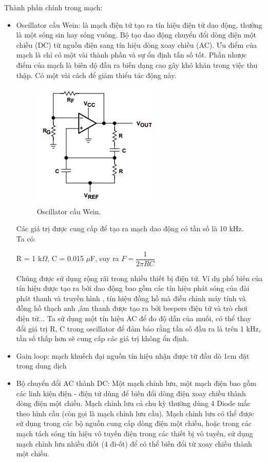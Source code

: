 \documentclass[a4paper,12pt,oneside]{article}
\begin{document}
\begin{enumerate}
\noindent Thành phần chính trong mạch:
\begin{itemize}
\item Oscillator cầu Wein: là mạch điện tử tạo ra tín hiệu điện tử dao động, thường là một sóng sin hay sóng vuông. Bộ tạo dao động chuyển đổi dòng điện một chiều (DC) từ nguồn điện sang tín hiệu dòng xoay chiều (AC). Ưu điểm của mạch là chỉ có một vài thành phần và sự ổn định tần số tốt. Phần nhược điểm của mạch là biên độ đầu ra biến dạng cao gây khó khăn trong việc thu thập. Có một vài cách để giảm thiểu tác động này.
\begin{figure}[H]
\centering
\begin{center}
\includegraphics[scale=1]{hinh/PPM/ppm_wein.png}
\end{center}
\caption{Oscillator cầu Wein\cite{electrical}.}
\end{figure}
Các giá trị được cung cấp để tạo ra mạch dao động có tần số là 10 kHz.\\
Ta có:
\begin{center}
R = 1 k$\Omega$, C = 0.015 $\mu$F, suy ra $F = \dfrac{1}{2\pi RC}$
\end{center}
Chúng được sử dụng rộng rãi trong nhiều thiết bị điện tử. Ví dụ phổ biến của tín hiệu được tạo ra bởi dao động bao gồm các tín hiệu phát sóng của đài phát thanh và truyền hình , tín hiệu đồng hồ mà điều chỉnh máy tính và đồng hồ thạch anh ,âm thanh được tạo ra bởi beepers điện tử và trò chơi điện tử... Ta sử dụng một tín hiệu AC để đo độ dẫn của muối, có thể thay đổi giá trị R, C trong oscillator để đảm bảo rằng tần số đầu ra là trên 1 kHz, tần số thấp hơn sẽ cung cấp các giá trị không ổn định.
\item	Gain loop: mạch khuếch đại nguồn tín hiệu nhận được từ đầu dò 1cm đặt trong dung dịch
\item	Bộ chuyển đổi AC thành DC:  Một mạch chỉnh lưu, một mạch điện bao gồm các linh kiện điện - điện tử dùng để biến đổi dòng điện xoay chiều thành dòng điện một chiều. Mạch chỉnh lưu cả chu kỳ thường dùng 4 Diode mắc theo hình cầu (còn gọi là mạch chỉnh lưu cầu). Mạch chỉnh lưu có thể được sử dụng trong các bộ nguồn cung cấp dòng điện một chiều, hoặc trong các mạch tách sóng tín hiệu vô tuyến điện trong các thiết bị vô tuyến, sử dụng mạch chỉnh lưu nhiều điốt (4 đi-ốt) để có thể biến đổi từ xoay chiều thành một chiều.

\end{itemize}
\end{enumerate}
\end{document}
